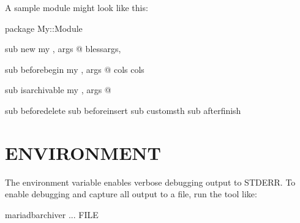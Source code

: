 \documentclass[letterpaper,10pt,english]{sphinxmanual}
\begin{document}
A sample module might look like this:

\begin{sphinxVerbatim}[commandchars=\\\{\}]
package My::Module

sub new 
   my  , \PYGZpc{}args   @\PYGZus{}
    blessargs, 

sub before\PYGZus{}begin 
   my  , \PYGZpc{}args   @\PYGZus{}
   \PYGZhy{}\PYGZgt{}cols  cols

sub is\PYGZus{}archivable 
   my  , \PYGZpc{}args   @\PYGZus{}
    

sub before\PYGZus{}delete  
sub before\PYGZus{}insert  
sub custom\PYGZus{}sth     
sub after\PYGZus{}finish   

\end{sphinxVerbatim}


\section{ENVIRONMENT}
\label{\detokenize{mariadb-archiver:environment}}
The environment variable  enables verbose debugging output to STDERR.
To enable debugging and capture all output to a file, run the tool like:

\begin{sphinxVerbatim}[commandchars=\\\{\}]
 mariadb\PYGZhy{}archiver ... \PYGZgt{} FILE \PYGZgt{}
\end{sphinxVerbatim}
\end{document}
